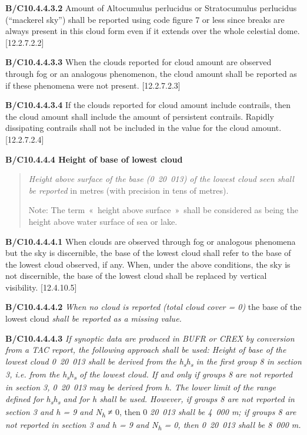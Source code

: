 \textbf{B/C10.4.4.3.2} Amount of Altocumulus perlucidus or Stratocumulus perlucidus (``mackerel sky'') shall be reported using code figure 7 or less since breaks are always present in this cloud form even if it extends over the whole celestial dome. {[}12.2.7.2.2{]}

\textbf{B/C10.4.4.3.3} When the clouds reported for cloud amount are observed through fog or an analogous phenomenon, the cloud amount shall be reported as if these phenomena were not present. {[}12.2.7.2.3{]}

\textbf{B/C10.4.4.3.4} If the clouds reported for cloud amount include contrails, then the cloud amount shall include the amount of persistent contrails. Rapidly dissipating contrails shall not be included in the value for the cloud amount. {[}12.2.7.2.4{]}

\textbf{B/C10.4.4.4 Height of base of lowest cloud}

\begin{quote}
\emph{Height above surface of the base (0~20~013) of the lowest cloud seen shall be reported} in metres (with precision in tens of metres).

Note: The term~«~height above surface~»~shall be considered as being the height above water surface of sea or lake.
\end{quote}

\textbf{B/C10.4.4.4.1} When clouds are observed through fog or analogous phenomena but the sky is discernible, the base of the lowest cloud shall refer to the base of the lowest cloud observed, if any. When, under the above conditions, the sky is not discernible, the base of the lowest cloud shall be replaced by vertical visibility. {[}12.4.10.5{]}

\textbf{B/C10.4.4.4.2} \emph{When no cloud is reported (total cloud cover = 0)} the base of the lowest cloud \emph{shall be reported as a missing value.}

\textbf{B/C10.4.4.4.3} \emph{If synoptic data are produced in BUFR or CREX by conversion from a TAC report, the following approach shall be used: Height of base of the lowest cloud 0}~\emph{20}~\emph{013 shall be derived from the h\textsubscript{s}h\textsubscript{s} in the first group 8 in section 3, i.e. from the h\textsubscript{s}h\textsubscript{s} of the lowest cloud. If and only if groups 8 are not reported in section 3, 0}~\emph{20}~\emph{013 may be derived from h. The lower limit of the range defined for h\textsubscript{s}h\textsubscript{s} and for h shall be used. However, if groups 8 are not reported in section 3 and h = 9 and N\textsubscript{h}} ≠ 0, then 0 \emph{20}~\emph{013 shall be 4}~\emph{000 m; if groups 8 are not reported in section 3 and h = 9 and N\textsubscript{h} = 0, then 0}~\emph{20}~\emph{013 shall be 8}~\emph{000 m.}

